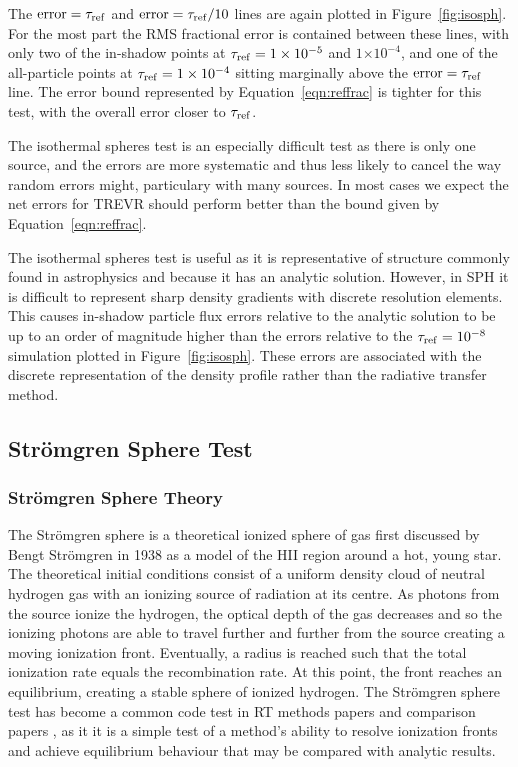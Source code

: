 \documentclass[fleq,usenatbib]{mnras}
\newcommand{\acro}{TREVR}
\providecommand{\e}[1]{\ensuremath{\times10^{#1}}}
\newcommand{\tr}{\tau_{\rm ref}}
\newcommand{\strom}{Str\"omgren}
\begin{document}
{The $\rm{error}=\tr$ and $\rm{error}=\tr/10$ lines are again plotted in 
Figure~\ref{fig:isosph}. For the most part the RMS fractional error is 
contained between these lines, with only two of the in-shadow points at 
$\tr=1\e{-5}$ and $1\e{-4}$,  and one of the all-particle points at  
$\tr=1\e{-4}$ sitting marginally above the $\rm{error}=\tr$ line. The error 
bound represented by Equation~\ref{eqn:reffrac} is tighter for this test, with 
the overall error closer to $\tr$.

The isothermal spheres test is an especially difficult test as there 
is only one source, and the errors are more systematic and thus less likely
to cancel the way random errors might, particulary with many sources.
In most cases we expect the net errors for \acro{} should perform better than the bound
given by Equation~\ref{eqn:reffrac}.

The isothermal spheres test is useful as it is representative of structure
commonly found in astrophysics and because it has an analytic solution. 
However, in SPH it is difficult to represent sharp density gradients with 
discrete resolution elements. This causes in-shadow particle flux errors relative 
to the analytic solution to be up to an order of magnitude higher than 
the errors relative to the $\tr = 10^{-8}$ simulation plotted in 
Figure~\ref{fig:isosph}. These errors are associated with the discrete 
representation
of the density profile rather than the radiative transfer method.

\subsection{\strom{} Sphere Test} \label{stromgren}
\subsubsection{\strom{} Sphere Theory}
The \strom{} sphere is a theoretical ionized sphere of gas first discussed by 
Bengt \strom{} in 1938 \citep{stromgren39} as a model of the HII region around 
a hot, young star. The theoretical initial conditions consist of a uniform 
density cloud of neutral hydrogen gas with an ionizing source of radiation at 
its centre. As photons from the source ionize the hydrogen, the optical depth 
of the gas decreases and so the ionizing photons are able to travel further 
and further from the source creating a moving ionization front.  Eventually,
a radius is reached such that the total ionization 
rate equals the recombination rate.  At this point, the front reaches an 
equilibrium, creating a stable sphere of ionized hydrogen. The \strom{} sphere 
test has become a common code test in RT methods papers \citep{pawlikSchaye08,
pawlikSchaye11, petkovaSpringel11} and comparison papers \citep{ilievEt06, 
ilievEt09}, as it it is a simple test of a method's ability to resolve 
ionization fronts and achieve equilibrium behaviour that may be compared with 
analytic results.

}
\end{document}
